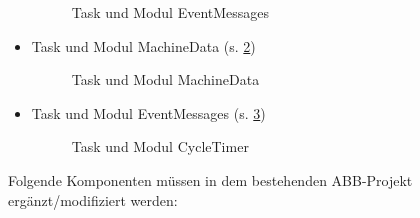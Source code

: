 \begin{itemize}
\begin{figure}[H]
	\caption[Task und Modul EventMessages]{Task und Modul EventMessages}
	\label{fig:taskEventMessages}
	\end{figure}
\item Task und Modul MachineData (s. \ref{fig:taskMachineData})
	\begin{figure}[H]
		\centering
		\caption[Task und Modul MachineData]{Task und Modul MachineData}
		\label{fig:taskMachineData}
		\end{figure}
\item Task und Modul EventMessages (s. \ref{fig:taskCycleTimer})
\begin{figure}[H]
	\centering
	\caption[Task und Modul CycleTimer]{Task und Modul CycleTimer}
	\label{fig:taskCycleTimer}
\end{figure}

\end{itemize}  
Folgende Komponenten müssen in dem bestehenden ABB-Projekt 
ergänzt/modifiziert werden:
